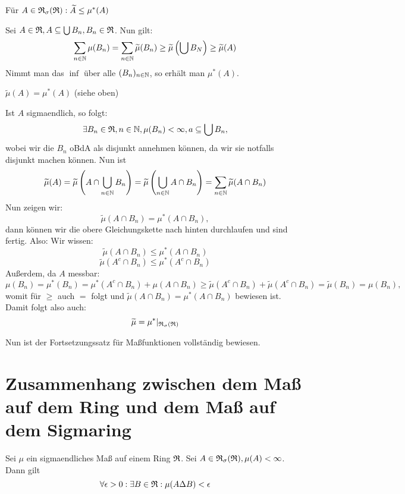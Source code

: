 			\begin{satz}
				Für $A\in\mathfrak{R}_\sigma(\mathfrak{R}): \widetilde{A}\le \mu^*(A)$
			\end{satz}
			
			\begin{bew}
				Sei $A\in\mathfrak{R}, A\subseteq \bigcup B_n, B_n\in\mathfrak{R}$. Nun gilt:
				\[ \sum_{n\in\mathbb{N}}\mu(B_n)=\sum_{n\in\mathbb{N}} \widetilde{\mu}(B_n)\ge \widetilde{\mu}\left(\bigcup B_N\right)\ge \widetilde{\mu}(A) \]
				Nimmt man das $\inf$ über alle $(B_n)_{n\in\mathbb{N}}$, so erhält man $\mu^*(A)$.
			\end{bew}
			
			\begin{satz}
				$\widetilde{\mu}(A)=\mu^*(A)$ (siehe oben)
			\end{satz}
			
			\begin{bew}
				Ist $A$ sigmaendlich, so folgt:
				\[ \exists B_n\in\mathfrak{R}, n\in\mathbb{N}, \mu(B_n)<\infty, a\subseteq \bigcup B_n, \]
				wobei wir die $B_n$ oBdA als disjunkt annehmen können, da wir sie notfalls disjunkt machen können.\newline
				Nun ist
				\[ \widetilde{\mu}(A)=\widetilde{\mu}\left(A\cap\bigcup_{n\in\mathbb{N}}B_n\right)=\widetilde{\mu}\left(\bigcup_{n\in\mathbb{N}}A\cap B_n\right)=\sum_{n\in\mathbb{N}} \widetilde{\mu}(A\cap B_n) \]
				Nun zeigen wir:
				\[ \widetilde{\mu}(A\cap B_n)=\mu^*(A\cap B_n), \]
				dann können wir die obere Gleichungskette nach hinten durchlaufen und sind fertig.\newline
				Also: Wir wissen: 
				\[ \widetilde{\mu}(A\cap B_n)\le \mu^*(A\cap B_n) \]
				\[ \widetilde{\mu}(A^c\cap B_n)\le\mu^*(A^c\cap B_n) \]
				Außerdem, da $A$ messbar:
				\[ \mu(B_n)=\mu^*(B_n)=\mu^*(A^c\cap B_n)+\mu(A\cap B_n)\ge \widetilde{\mu}(A^c\cap B_n)+\widetilde{\mu}(A^c\cap B_n)=\widetilde{\mu}(B_n)=\mu(B_n), \]
				womit für $\ge$ auch $=$ folgt und $\widetilde{\mu}(A\cap B_n)=\mu^*(A\cap B_n)$ bewiesen ist. Damit folgt also auch:\[ \widetilde{\mu}=\mu^*|_{\mathfrak{R}_\sigma(\mathfrak{R})} \]
			\end{bew}
			
			\begin{bem}
				Nun ist der Fortsetzungssatz für Maßfunktionen vollständig bewiesen.
			\end{bem}
			
			\section{Zusammenhang zwischen dem Maß auf dem Ring und dem Maß auf dem Sigmaring}
			\begin{satz} [Approximationstheorem I]
				Sei $\mu$ ein sigmaendliches Maß auf einem Ring $\mathfrak{R}$. Sei $A\in\mathfrak{R}_\sigma(\mathfrak{R}), \mu(A)<\infty$. Dann gilt
				\[ \forall \epsilon>0: \exists B\in\mathfrak{R}: \mu(A\Delta B)<\epsilon \]
			\end{satz}
			
